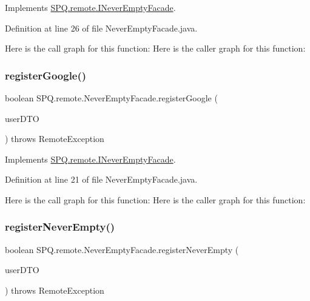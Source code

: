 Implements \mbox{\hyperlink{interface_s_p_q_1_1remote_1_1_i_never_empty_facade_a7b2f025522489fe9070d09a4fb08f0a1}{S\+P\+Q.\+remote.\+I\+Never\+Empty\+Facade}}.



Definition at line 26 of file Never\+Empty\+Facade.\+java.

Here is the call graph for this function\+:
Here is the caller graph for this function\+:
\mbox{\label{class_s_p_q_1_1remote_1_1_never_empty_facade_aaa8d4a6148957029af068d00da24890b}} 
\subsubsection{\texorpdfstring{register\+Google()}{registerGoogle()}}
{\footnotesize\ttfamily boolean S\+P\+Q.\+remote.\+Never\+Empty\+Facade.\+register\+Google (\begin{DoxyParamCaption}\item[{\mbox{\hyperlink{class_s_p_q_1_1dto_1_1_user_d_t_o}{User\+D\+TO}}}]{user\+D\+TO }\end{DoxyParamCaption}) throws Remote\+Exception}



Implements \mbox{\hyperlink{interface_s_p_q_1_1remote_1_1_i_never_empty_facade_a93f3250c09a26fdb1d65219599dfd542}{S\+P\+Q.\+remote.\+I\+Never\+Empty\+Facade}}.



Definition at line 21 of file Never\+Empty\+Facade.\+java.

Here is the call graph for this function\+:
Here is the caller graph for this function\+:
\mbox{\label{class_s_p_q_1_1remote_1_1_never_empty_facade_a52a0feff1dfb3347e55e46c3ac48fafc}} 
\subsubsection{\texorpdfstring{register\+Never\+Empty()}{registerNeverEmpty()}}
{\footnotesize\ttfamily boolean S\+P\+Q.\+remote.\+Never\+Empty\+Facade.\+register\+Never\+Empty (\begin{DoxyParamCaption}\item[{\mbox{\hyperlink{class_s_p_q_1_1dto_1_1_user_d_t_o}{User\+D\+TO}}}]{user\+D\+TO }\end{DoxyParamCaption}) throws Remote\+Exception}




